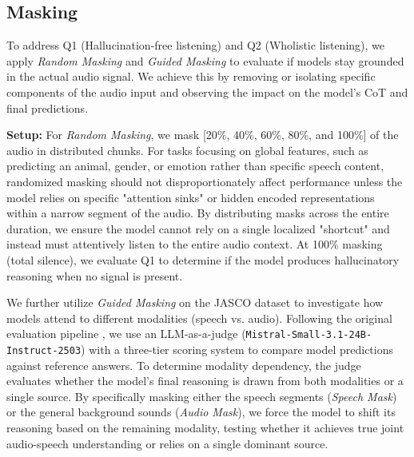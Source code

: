 \subsection{Masking}
\label{sec:masking}


To address Q1 (Hallucination-free listening) and Q2 (Wholistic listening), we apply \textit{Random Masking} and \textit{Guided Masking} to evaluate if models stay grounded in the actual audio signal. We achieve this by removing or isolating specific components of the audio input and observing the impact on the model's CoT and final predictions.

\noindent \textbf{Setup:} 
For \textit{Random Masking}, we mask [20\%, 40\%, 60\%, 80\%, and 100\%] of the audio in distributed chunks. For tasks focusing on global features, such as predicting an animal, gender, or emotion rather than specific speech content, randomized masking should not disproportionately affect performance unless the model relies on specific "attention sinks" or hidden encoded representations within a narrow segment of the audio. By distributing masks across the entire duration, we ensure the model cannot rely on a single localized "shortcut" and instead must attentively listen to the entire audio context. At 100\% masking (total silence), we evaluate Q1 to determine if the model produces hallucinatory reasoning when no signal is present. 

We further utilize \textit{Guided Masking} on the JASCO dataset \cite{wang2025they} to investigate how models attend to different modalities (speech vs. audio). Following the original evaluation pipeline \cite{wang2025they}, we use an LLM-as-a-judge (\texttt{Mistral-Small-3.1-24B-Instruct-2503}) with a three-tier scoring system to compare model predictions against reference answers. To determine modality dependency, the judge evaluates whether the model’s final reasoning is drawn from both modalities or a single source. By specifically masking either the speech segments (\textit{Speech Mask}) or the general background sounds (\textit{Audio Mask}), we force the model to shift its reasoning based on the remaining modality, testing whether it achieves true joint audio-speech understanding or relies on a single dominant source.


